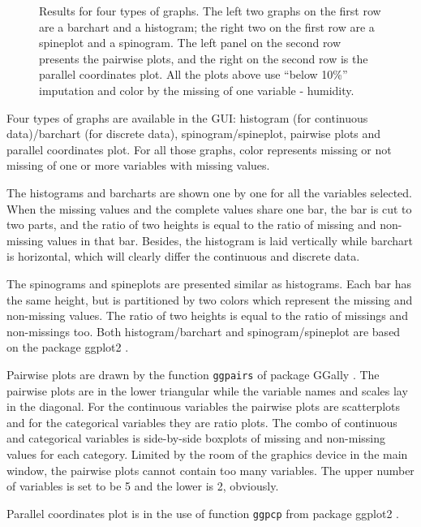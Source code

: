 \documentclass[english]{article}
\newcommand{\pkg}[1]{{\fontseries{b}\selectfont #1}}
\begin{document}
\begin{center}
\begin{figure}[h]
\caption{\label{fig:graphtypes}{Results for four types of graphs.
The left two graphs on the first row are a barchart and a histogram; the right two on the first row are a spineplot and a spinogram. The left panel on the second row presents the pairwise plots, and the right on the second row is the parallel coordinates plot. All the plots above use ``below 10\%'' imputation and color by the missing of one variable - humidity. }}

\end{figure}

\par\end{center}

Four types of graphs are available in the GUI: histogram (for continuous data)/barchart (for discrete data), spinogram/spineplot, pairwise plots and parallel coordinates plot. For all those graphs, color represents missing or not missing of one or more variables with missing values. 

The histograms and barcharts are shown one by one for all the variables selected. When the missing values and the complete values share one bar, the bar is cut to two parts, and the ratio of two heights is equal to the ratio of missing and non-missing values in that bar. Besides, the histogram is laid vertically while barchart is horizontal, which will clearly differ the continuous and discrete data.

The spinograms and spineplots are presented similar as histograms. Each bar has the same height, but is partitioned by two colors which represent the missing and non-missing values. The ratio of two heights is equal to the ratio of missings and non-missings too. Both histogram/barchart and spinogram/spineplot are based on the package \pkg{ggplot2} \citep{ggplot2}.

Pairwise plots are drawn by the function \texttt{ggpairs} of package \pkg{GGally} \citep{ggally}. The pairwise plots are in the lower triangular while the variable names and scales lay in the diagonal. For the continuous variables the pairwise plots are scatterplots and for the categorical variables they are ratio plots. The combo of continuous and categorical variables is side-by-side boxplots of missing and non-missing values for each category. Limited by the room of the graphics device in the main window, the pairwise plots cannot contain too many variables. The upper number of variables is set to be 5 and the lower is 2, obviously.

Parallel coordinates plot is in the use of function \texttt{ggpcp} from package \pkg{ggplot2} \citep{ggplot2}.
\end{document}
